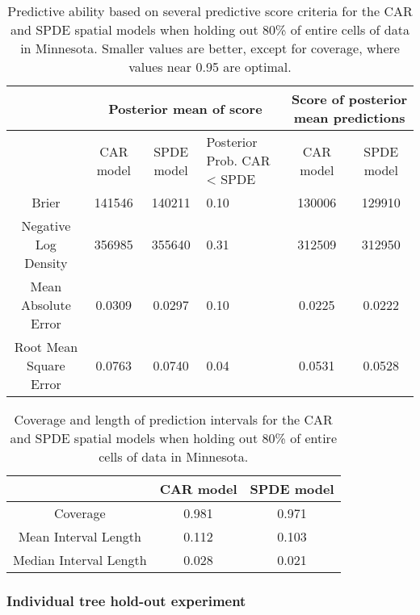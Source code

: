 \documentclass[12pt]{article}\usepackage[]{graphicx}\usepackage[]{color}
\providecommand{\tabularnewline}{\\}
\begin{document}
\begin{table}
\caption{Predictive ability based on several predictive score criteria for
the CAR and SPDE spatial models when holding out 80\% of entire cells
of data in Minnesota. Smaller values are better, except for coverage,
where values near 0.95 are optimal.}


\begin{tabular}{|c|c|c|>{\centering}p{3cm}|c|c|}
\hline 
 &
\multicolumn{3}{c|}{{\small{Posterior mean of score}}} &
\multicolumn{2}{c|}{{\small{Score of posterior mean predictions}}}\tabularnewline
\hline 
\hline 
 &
{\small{CAR model}} &
{\small{SPDE model}} &
{\small{Posterior Prob. CAR < SPDE}} &
{\small{CAR model}} &
{\small{SPDE model}}\tabularnewline
\hline 
{\small{Brier}} &
{\small{141546}} &
{\small{140211}} &
{\small{0.10}} &
{\small{130006}} &
{\small{129910}}\tabularnewline
\hline 
{\small{Negative Log Density}} &
{\small{356985}} &
{\small{355640}} &
{\small{0.31}} &
{\small{312509}} &
{\small{312950}}\tabularnewline
\hline 
{\small{Mean Absolute Error}} &
{\small{0.0309}} &
{\small{0.0297}} &
{\small{0.10}} &
{\small{0.0225}} &
{\small{0.0222}}\tabularnewline
\hline 
{\small{Root Mean Square Error}} &
{\small{0.0763}} &
{\small{0.0740}} &
{\small{0.04}} &
{\small{0.0531}} &
{\small{0.0528}}\tabularnewline
\hline 
\end{tabular}

\label{tab:score_cell_20percent}
\end{table}


\begin{table}
\caption{Coverage and length of prediction intervals for the CAR and SPDE spatial
models when holding out 80\% of entire cells of data in Minnesota. }


\begin{tabular}{|c|c|c|}
\hline 
 &
{\small{CAR model}} &
{\small{SPDE model}}\tabularnewline
\hline 
{\small{Coverage}} &
{\small{0.981}} &
{\small{0.971}}\tabularnewline
\hline 
{\small{Mean Interval Length}} &
{\small{0.112}} &
{\small{0.103}}\tabularnewline
\hline 
{\small{Median Interval Length}} &
{\small{0.028}} &
{\small{0.021}}\tabularnewline
\hline 
\end{tabular}

\label{tab:coverage_cell_20percent}
\end{table}



\subsubsection{Individual tree hold-out experiment}
\end{document}
